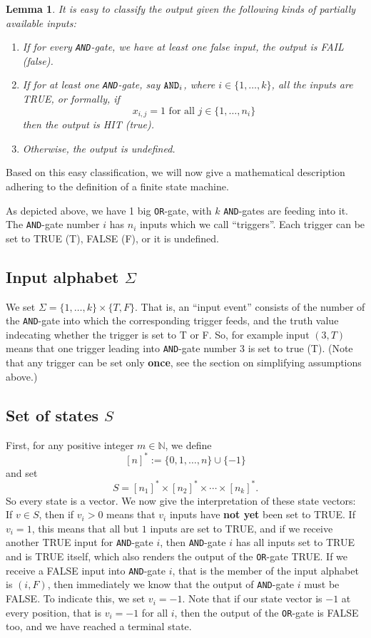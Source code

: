 \documentclass[12pt]{amsart}
\newtheorem{lemma}{\bf Lemma}[section]
\begin{document}
\begin{lemma}\label{classify}
It is easy to classify the output given the following
kinds of partially available inputs:
\begin{enumerate}
    \item If for every {\tt AND}-gate, we have at least 
        one false input, the output is FAIL (false).
    \item If for at least one {\tt AND}-gate, say 
        ${\tt AND}_i$, where $i\in\{1,\ldots,k\}$, all the inputs 
        are TRUE, or formally,
        if $$x_{i,j} = 1 \text{ for all } j\in \{1,\ldots,n_i\}$$
        then the output is HIT (true).
    \item Otherwise, the output is undefined.
\end{enumerate}
\end{lemma}
Based on this easy classification, we will now give a mathematical
description adhering to the definition of a finite state machine.

As depicted above, we have 1 big {\tt OR}-gate, with
$k$ {\tt AND}-gates are feeding into it. The {\tt AND}-gate number $i$
has $n_i$ inputs which we call ``triggers''. Each trigger can 
be set to TRUE (T), FALSE (F), or it is undefined.

\subsection{Input alphabet $\Sigma$} We set  $\Sigma = \{1,\ldots,k\} \times \{T, F\}$. 
    That is, an ``input event'' consists of the number of the {\tt AND}-gate 
    into which the corresponding trigger feeds, and the truth value 
    indecating whether the trigger is set to T or F. So, for example
    input $(3, T)$ means that one trigger leading into {\tt AND}-gate
    number 3 is set to true (T). (Note that any trigger can be set only
    {\bf once}, see the section on simplifying assumptions above.)

\subsection{Set of states $S$} First, for any positive integer $m\in\mathbb{N}$,
    we define $$[n]^* := \{0,1,\ldots,n\} \cup\{-1\}$$ 
    and set $$S = [n_1]^* \times [n_2]^* \times \cdots \times [n_k]^*.$$
    So every state is a vector. We now give the interpretation of these
    state vectors: If $v\in S$, then if $v_i >0$ means that $v_i$ inputs
    have {\bf not yet} been set to TRUE.  If $v_i=1$, this means that all but $1$
    inputs are set to TRUE, and if we receive another TRUE input for {\tt AND}-gate $i$,
    then {\tt AND}-gate $i$ has all inputs set to TRUE and is TRUE itself,
    which also renders the output of the {\tt OR}-gate TRUE. If we receive a
    FALSE input into {\tt AND}-gate $i$, that is the member of the input alphabet
    is $(i, F)$, then immediately we know that the output of {\tt AND}-gate $i$ 
    must be FALSE. To indicate this, we set $v_i = -1$. Note that if 
    our state vector is $-1$ at every position, that is $v_i = -1$ for all $i$, 
    then the output of the {\tt OR}-gate is FALSE too, and we have reached 
    a terminal state.
    
\end{document}
